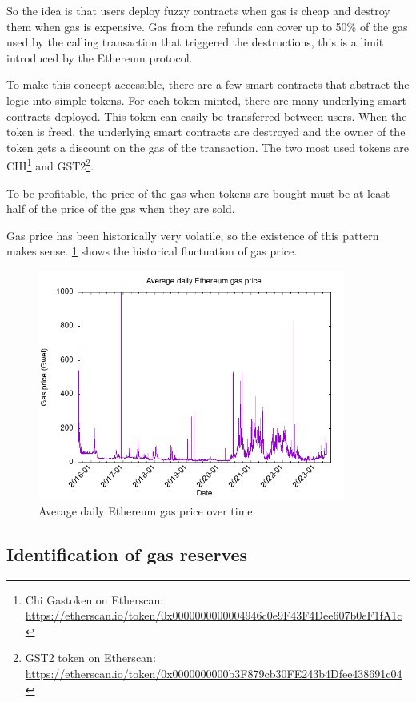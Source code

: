 So the idea is that users deploy fuzzy contracts when gas is cheap and destroy them when gas is expensive. Gas from the refunds can cover up to 50\% of the gas used by the calling transaction that triggered the destructions, this is a limit introduced by the Ethereum protocol. 

To make this concept accessible, there are a few smart contracts that abstract the logic into simple tokens. For each token minted, there are many underlying smart contracts deployed. This token can easily be transferred between users. When the token is freed, the underlying smart contracts are destroyed and the owner of the token gets a discount on the gas of the transaction. The two most used tokens are CHI\footnote{Chi Gastoken on Etherscan: \url{https://etherscan.io/token/0x0000000000004946c0e9F43F4Dee607b0eF1fA1c}} and GST2\footnote{GST2 token on Etherscan: \url{https://etherscan.io/token/0x0000000000b3F879cb30FE243b4Dfee438691c04}}.

To be profitable, the price of the gas when tokens are bought must be at least half of the price of the gas when they are sold. 

Gas price has been historically very volatile, so the existence of this pattern makes sense. \cref{fig:gas-price} shows the historical fluctuation of gas price.

\begin{figure}[!ht]
    \centering
    \includegraphics[width=0.9\textwidth]{Figures/analysis/gas-price.png}
    \caption{Average daily Ethereum gas price over time.}
    \label{fig:gas-price}
\end{figure}

\subsection{Identification of gas reserves}

